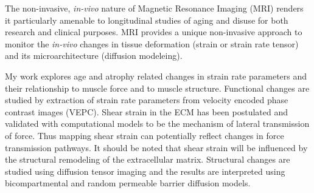 The non-invasive, \textit{in-vivo} nature of Magnetic Resonance Imaging (MRI) renders it particularly amenable to longitudinal studies of aging and disuse for both research and clinical purposes. 
MRI provides a unique non-invasive approach to monitor the \textit{in-vivo} changes in tissue deformation (strain or strain rate tensor) and its microarchitecture (diffusion modeleing).

My work explores age and atrophy related changes in strain rate parameters and their relationship to muscle force and to muscle structure.
Functional changes are studied by extraction of strain rate parameters from velocity encoded phase contrast images (VEPC).
Shear strain in the ECM has been postulated and validated with computational models to be the mechanism of lateral transmission of force. Thus mapping shear strain can potentially reflect changes in force transmission pathways.
It should be noted that shear strain will be influenced by the structural remodeling of the extracellular matrix.
Structural changes are studied using diffusion tensor imaging and the results are interpreted using bicompartmental and random permeable barrier diffusion models.